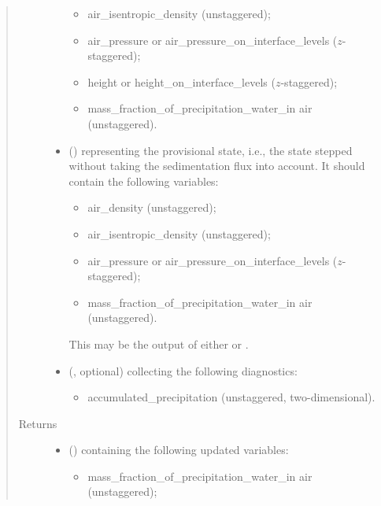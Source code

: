 \documentclass[letterpaper,10pt,english]{sphinxmanual}
\begin{document}
\begin{fulllineitems}
\begin{fulllineitems}
\begin{quote}
\begin{description}
\begin{itemize}
\begin{itemize}
\item {} 
air\_isentropic\_density (unstaggered);

\item {} 
air\_pressure or air\_pressure\_on\_interface\_levels (\(z\)-staggered);

\item {} 
height or height\_on\_interface\_levels (\(z\)-staggered);

\item {} 
mass\_fraction\_of\_precipitation\_water\_in air (unstaggered).

\end{itemize}


\item {} 
 () \textendash{} 
 representing the provisional state, i.e.,
the state stepped without taking the sedimentation flux into account.
It should contain the following variables:
\begin{itemize}
\item {} 
air\_density (unstaggered);

\item {} 
air\_isentropic\_density (unstaggered);

\item {} 
air\_pressure or air\_pressure\_on\_interface\_levels (\(z\)-staggered);

\item {} 
mass\_fraction\_of\_precipitation\_water\_in air (unstaggered).

\end{itemize}

This may be the output of either
 or
.


\item {} 
 (, optional) \textendash{} 
 collecting the following diagnostics:
\begin{itemize}
\item {} 
accumulated\_precipitation (unstaggered, two-dimensional).

\end{itemize}


\end{itemize}

\item[{Returns}] \leavevmode
\begin{itemize}
\item {} 
 () \textendash{}  containing the following updated variables:
\begin{itemize}
\item {} 
mass\_fraction\_of\_precipitation\_water\_in air (unstaggered);


\end{itemize}
\end{itemize}
\end{description}
\end{quote}
\end{fulllineitems}
\end{fulllineitems}
\end{document}

